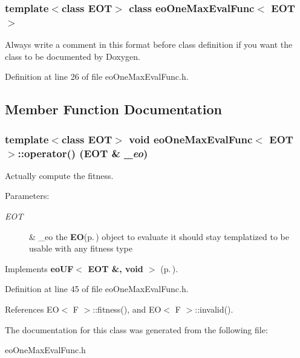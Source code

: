 \subsubsection*{template$<$class EOT$>$ class eo\-One\-Max\-Eval\-Func$<$ EOT $>$}

Always write a comment in this format before class definition if you want the class to be documented by Doxygen. 



Definition at line 26 of file eo\-One\-Max\-Eval\-Func.h.

\subsection{Member Function Documentation}
\subsubsection{\setlength{\rightskip}{0pt plus 5cm}template$<$class EOT$>$ void {\bf eo\-One\-Max\-Eval\-Func}$<$ {\bf EOT} $>$::operator() ({\bf EOT} \& {\em \_\-eo})\hspace{0.3cm}{\tt  [inline, virtual]}}\label{classeo_one_max_eval_func_a1}


Actually compute the fitness. 

\begin{Desc}
\item[Parameters:]
\begin{description}
\item[{\em EOT}]\& \_\-eo the {\bf EO}{\rm (p.\,\pageref{class_e_o})} object to evaluate it should stay templatized to be usable with any fitness type \end{description}
\end{Desc}


Implements {\bf eo\-UF$<$ EOT \&, void $>$} {\rm (p.\,\pageref{classeo_u_f_a1})}.

Definition at line 45 of file eo\-One\-Max\-Eval\-Func.h.

References EO$<$ F $>$::fitness(), and EO$<$ F $>$::invalid().

The documentation for this class was generated from the following file:\begin{CompactItemize}
\item 
eo\-One\-Max\-Eval\-Func.h\end{CompactItemize}
